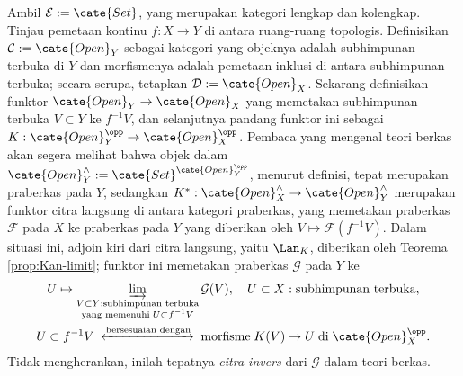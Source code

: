 \begin{contoh}
	Ambil $\mathcal{E} := \cate{Set}$, yang merupakan kategori lengkap dan
	kolengkap. Tinjau pemetaan kontinu $f: X \to Y$ di antara ruang-ruang
	topologis. Definisikan $\mathcal{C} := \cate{Open}_Y$ sebagai kategori yang
	objeknya adalah subhimpunan terbuka di $Y$ dan morfismenya adalah pemetaan
	inklusi di antara subhimpunan terbuka; secara serupa, tetapkan
	$\mathcal{D} := \cate{Open}_X$. Sekarang definisikan funktor
	$\cate{Open}_Y \to \cate{Open}_X$ yang memetakan subhimpunan terbuka
	$V \subset Y$ ke $f^{-1} V$, dan selanjutnya pandang funktor ini sebagai
	$K: \cate{Open}_Y^{\opp} \to \cate{Open}_X^{\opp}$. Pembaca yang mengenal
	teori berkas akan segera melihat bahwa objek dalam
	$\cate{Open}_Y^\wedge := \cate{Set}^{\cate{Open}_Y^{\opp}}$, menurut
	definisi, tepat merupakan praberkas pada $Y$, sedangkan
	$K^*: \cate{Open}_X^\wedge \to \cate{Open}_Y^\wedge$ merupakan funktor
	citra langsung di antara kategori praberkas, yang memetakan praberkas
	$\mathcal{F}$ pada $X$ ke praberkas pada $Y$ yang diberikan oleh
	$V \mapsto \mathcal{F}(f^{-1} V)$. Dalam situasi ini, adjoin kiri dari
	citra langsung, yaitu $\Lan_K$, diberikan oleh Teorema
	\ref{prop:Kan-limit}; funktor ini memetakan praberkas $\mathcal{G}$ pada
	$Y$ ke
	\begin{gather*}
		U \mapsto \varinjlim_{\substack{V \subset Y: \text{subhimpunan terbuka} \\ \text{yang memenuhi}\; U \subset f^{-1} V }} \mathcal{G}(V), \quad U \subset X: \text{subhimpunan terbuka}, \\
		U \subset f^{-1}V \;\xleftrightarrow{\text{bersesuaian dengan}}\; \text{morfisme}\; K(V) \to U \;\text{di}\; \cate{Open}_X^{\opp}.
	\end{gather*}
	Tidak mengherankan, inilah tepatnya \emph{citra invers} dari
	$\mathcal{G}$ dalam teori berkas.
\end{contoh}
